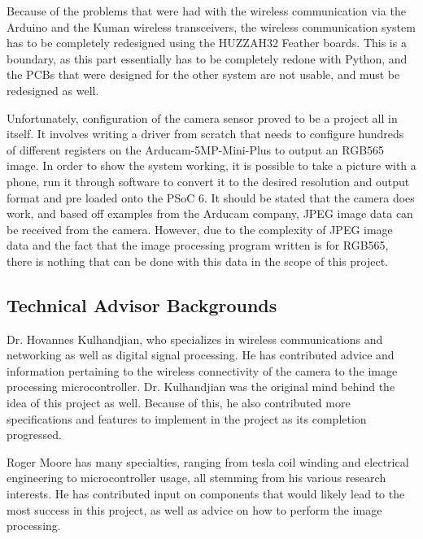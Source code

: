 \setlength{\parindent}{2.5ex} Because of the problems that were had with the wireless communication via the Arduino and the Kuman wireless transceivers, the wireless communication system has to be completely redesigned using the HUZZAH32 Feather boards. This is a boundary, as this part essentially has to be completely redone with Python, and the PCBs that were designed for the other system are not usable, and must be redesigned as well.\par
\setlength{\parindent}{2.5ex}
Unfortunately, configuration of the camera sensor proved to be a project all in itself. It involves writing a driver from scratch that needs to configure hundreds of different registers on the Arducam-5MP-Mini-Plus to output an RGB565 image. In order to show the system working, it is possible to take a picture with a phone, run it through software to convert it to the desired resolution and output format and pre loaded onto the PSoC 6. It should be stated that the camera does work, and based off examples from the Arducam company, JPEG image data can be received from the camera. However, due to the complexity of JPEG image data and the fact that the image processing program written is for RGB565, there is nothing that can be done with this data in the scope of this project.

\subsection{Technical Advisor Backgrounds} \par	
\setlength{\parindent}{2.5ex} Dr. Hovannes Kulhandjian, who specializes in wireless communications and networking as well as digital signal processing. He has contributed advice and information pertaining to the wireless connectivity of the camera to the image processing microcontroller. Dr. Kulhandjian was the original mind behind the idea of this project as well. Because of this, he also contributed more specifications and features to implement in the project as its completion progressed.\par
\setlength{\parindent}{2.5ex}
Roger Moore has many specialties, ranging from tesla coil winding and electrical engineering to microcontroller usage, all stemming from his various research interests. He has contributed input on components that would likely lead to the most success in this project, as well as advice on how to perform the image processing.

